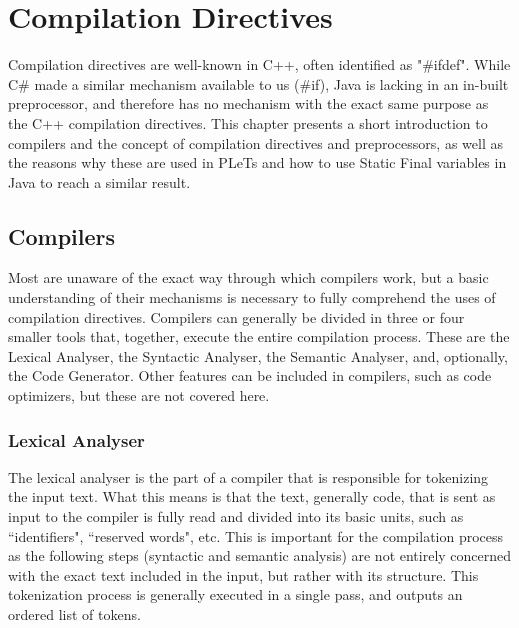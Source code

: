 \chapter{Compilation Directives}
\label{ch:staticfinal}

Compilation directives are well-known in C++, often identified as "\#ifdef". While C\# made a similar mechanism available to us (\#if), Java is lacking in an in-built preprocessor, and therefore has no mechanism with the exact same purpose as the C++ compilation directives. This chapter presents a short introduction to compilers and the concept of compilation directives and preprocessors, as well as the reasons why these are used in PLeTs and how to use Static Final variables in Java to reach a similar result.


\section{Compilers}

Most are unaware of the exact way through which compilers work, but a basic understanding of their mechanisms is necessary to fully comprehend the uses of compilation directives. Compilers can generally be divided in three or four smaller tools that, together, execute the entire compilation process. These are the Lexical Analyser, the Syntactic Analyser, the Semantic Analyser, and, optionally, the Code Generator. Other features can be included in compilers, such as code optimizers, but these are not covered here.


\subsection{Lexical Analyser}

The lexical analyser is the part of a compiler that is responsible for tokenizing the input text. What this means is that the text, generally code, that is sent as input to the compiler is fully read and divided into its basic units, such as ``identifiers", ``reserved words", etc. This is important for the compilation process as the following steps (syntactic and semantic analysis) are not entirely concerned with the exact text included in the input, but rather with its structure. This tokenization process is generally executed in a single pass, and outputs an ordered list of tokens.

